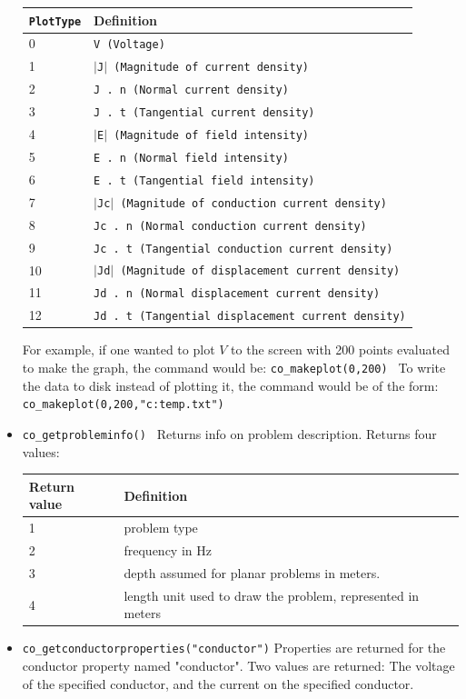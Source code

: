 \begin{itemize}
\begin{tabular}{ll}
\texttt{PlotType} &  Definition \\ \hline
 0 & \texttt{V (Voltage)} \\
 1 & \texttt{$\vert$J$\vert$ (Magnitude of current density)} \\
 2 & \texttt{J . n (Normal current density)} \\
 3 & \texttt{J . t (Tangential current density)} \\
 4 & \texttt{$\vert$E$\vert$ (Magnitude of field intensity)} \\
 5 & \texttt{E . n (Normal field intensity)} \\
 6 & \texttt{E . t (Tangential field intensity)} \\
 7 & \texttt{$\vert$Jc$\vert$ (Magnitude of conduction current density)} \\
 8 & \texttt{Jc . n (Normal conduction current density)} \\
 9 & \texttt{Jc . t (Tangential conduction current density)} \\
 10 & \texttt{$\vert$Jd$\vert$ (Magnitude of displacement current density)} \\
 11 & \texttt{Jd . n (Normal displacement current density)} \\
 12 & \texttt{Jd . t (Tangential displacement current density)} \\
\end{tabular}


For example, if one wanted to plot $V $ to the screen with 200 points evaluated
to make the graph, the command would be: \newline
\texttt{co\_makeplot(0,200) } \newline
To write the data to disk instead of plotting it, the command would be of
the form:\texttt{ } \newline
\texttt{co\_makeplot(0,200,"c:temp.txt")} \newline


\item \texttt{co\_getprobleminfo() } 
Returns info on problem description. Returns four values:

\begin{tabular}{ll} \hline
Return value & Definition \\ \hline 
1 &  problem type  \\ 
2 &  frequency in Hz \\ 
3 &  depth assumed for planar problems in meters.\\
4 &  length unit used to draw the problem, represented in meters
\end{tabular}

\item \texttt{co\_getconductorproperties("conductor")} Properties are returned for the
conductor property named "conductor". Two values are returned: The voltage
of the specified conductor, and the current on the specified
conductor.
\end{itemize}

